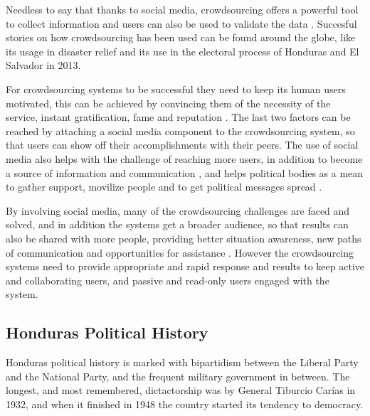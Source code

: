 \documentclass[a4paper,10pt]{article}
\begin{document}
Needless to say that thanks to social media, crowdsourcing offers a powerful tool to collect information and users can also be used to validate the data \citep{gao2011}. Succesful stories on how crowdsourcing has been used can be found around the globe, like its usage in disaster relief \citep{yin2012, gao2011} and its use in the electoral process of Honduras and El Salvador in 2013.

For crowdsourcing systems to be successful they need to keep its human users motivated, this can be achieved by convincing them of the necessity of the service, instant gratification, fame and reputation \citep{doan2011}. The last two factors can be reached by attaching a social media component to the crowdsourcing system, so that users can show off their accomplishments with their peers. The use of social media also helps with the challenge of reaching more users, in addition to become a source of information and communication \citep{yin2012}, and helps political bodies as a mean to gather support, movilize people and to get political messages spread \citep{map2014}.

By involving social media, many of the crowdsourcing challenges are faced and solved, and in addition the systems get a broader audience, so that results can also be shared with more people, providing better situation awareness, new paths of communication and opportunities for assistance \citep{gao2011}. However the crowdsourcing systems need to provide appropriate and rapid response and results to keep active and collaborating users, and passive and read-only users engaged with the system.


\subsection{Honduras Political History}

Honduras political history is marked with bipartidism between the Liberal Party and the National Party, and the frequent military government in between. The longest, and most remembered, dictactorship was by General Tiburcio Carías in 1932, and when it finished in 1948 the country started its tendency to democracy.
\end{document}
